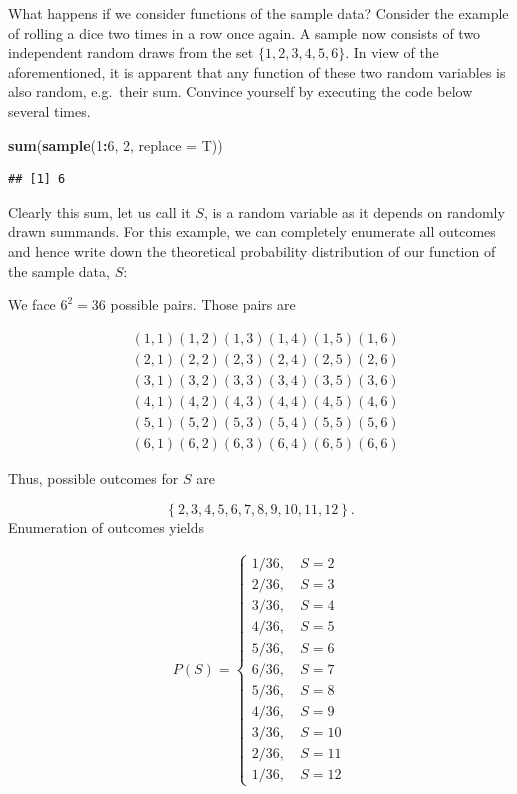 \documentclass[]{book}
\newenvironment{Shaded}{\begin{snugshade}}{\end{snugshade}}
\newcommand{\KeywordTok}[1]{\textcolor[rgb]{0.13,0.29,0.53}{\textbf{#1}}}
\newcommand{\DataTypeTok}[1]{\textcolor[rgb]{0.13,0.29,0.53}{#1}}
\newcommand{\DecValTok}[1]{\textcolor[rgb]{0.00,0.00,0.81}{#1}}
\newcommand{\OperatorTok}[1]{\textcolor[rgb]{0.81,0.36,0.00}{\textbf{#1}}}
\newcommand{\NormalTok}[1]{#1}
\theoremstyle{definition}
\theoremstyle{definition}
\theoremstyle{definition}
\theoremstyle{remark}
\begin{document}
What happens if we consider functions of the sample data? Consider the
example of rolling a dice two times in a row once again. A sample now
consists of two independent random draws from the set
\(\{1,2,3,4,5,6\}\). In view of the aforementioned, it is apparent that
any function of these two random variables is also random, e.g.~their
sum. Convince yourself by executing the code below several times.

\begin{Shaded}
\begin{Highlighting}[]
\KeywordTok{sum}\NormalTok{(}\KeywordTok{sample}\NormalTok{(}\DecValTok{1}\OperatorTok{:}\DecValTok{6}\NormalTok{, }\DecValTok{2}\NormalTok{, }\DataTypeTok{replace =}\NormalTok{ T))}
\end{Highlighting}
\end{Shaded}

\begin{verbatim}
## [1] 6
\end{verbatim}

Clearly this sum, let us call it \(S\), is a random variable as it
depends on randomly drawn summands. For this example, we can completely
enumerate all outcomes and hence write down the theoretical probability
distribution of our function of the sample data, \(S\):

We face \(6^2=36\) possible pairs. Those pairs are

\begin{align}
  &(1,1)    (1,2)   (1,3)   (1,4)   (1,5)   (1,6) \\ 
  &(2,1)    (2,2)   (2,3)   (2,4)   (2,5)   (2,6) \\ 
  &(3,1)    (3,2)   (3,3)   (3,4)   (3,5)   (3,6) \\ 
  &(4,1)    (4,2)   (4,3)   (4,4)   (4,5)   (4,6) \\ 
  &(5,1)    (5,2)   (5,3)   (5,4)   (5,5)   (5,6) \\ 
  &(6,1)    (6,2)   (6,3)   (6,4)   (6,5)   (6,6)
\end{align}

Thus, possible outcomes for \(S\) are

\[ \left\{ 2,3,4,5,6,7,8,9,10,11,12 \right\} . \] Enumeration of
outcomes yields

\begin{align}
  P(S) = 
  \begin{cases} 
    1/36, \ & S = 2 \\ 
    2/36, \ & S = 3 \\
    3/36, \ & S = 4 \\
    4/36, \ & S = 5 \\
    5/36, \ & S = 6 \\
    6/36, \ & S = 7 \\
    5/36, \ & S = 8 \\
    4/36, \ & S = 9 \\
    3/36, \ & S = 10 \\
    2/36, \ & S = 11 \\
    1/36, \ & S = 12
  \end{cases}
\end{align}
\end{document}
